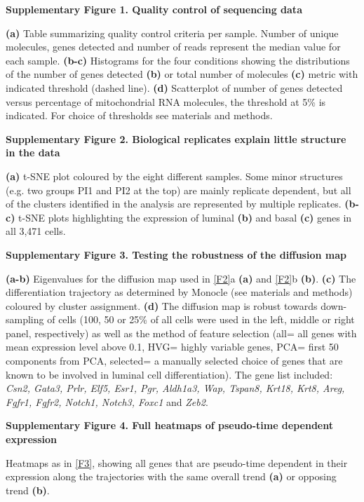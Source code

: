 \documentclass[titlepage, 12pt, oneside]{amsart}
\begin{document}
\textbf{Supplementary Figure 1. Quality control of sequencing data}

\textbf{(a)} Table summarizing quality control criteria per sample.
Number of unique molecules, genes detected and number of reads represent the median value for each sample.
\textbf{(b-c)} Histograms for the four conditions showing the distributions of the number of genes detected \textbf{(b)} or total number of molecules \textbf{(c)} metric with indicated threshold (dashed line).
\textbf{(d)} Scatterplot of number of genes detected versus percentage of mitochondrial RNA molecules, the threshold at 5\% is indicated.
For choice of thresholds see materials and methods.

\textbf{Supplementary Figure 2. Biological replicates explain little
structure in the data }

\textbf{(a)} t-SNE plot coloured by the eight different samples. Some minor structures (e.g. two groups PI1 and PI2 at the top) are mainly replicate dependent, but all of the clusters identified in the analysis are represented by multiple replicates.
\textbf{(b-c)} t-SNE plots highlighting the expression of luminal \textbf{(b)} and basal \textbf{(c)} genes in all 3,471 cells.

\textbf{Supplementary Figure 3. Testing the robustness of the diffusion
map}

\textbf{(a-b)} Eigenvalues for the diffusion map used in \autoref{F2}a
\textbf{(a)} and \autoref{F2}b \textbf{(b)}. 
\textbf{(c)} The differentiation trajectory as determined by Monocle (see materials and methods) coloured by cluster assignment.
\textbf{(d)} The diffusion map is robust towards down-sampling of cells (100, 50 or 25\% of all cells were used in the left, middle or right panel, respectively) as well as the method of feature selection (all= all genes with mean expression level above 0.1, HVG= highly variable genes, PCA= first 50 components from PCA, selected= a manually selected choice of genes that are known to be involved in luminal cell differentiation).
The gene list included: \textit{Csn2, Gata3, Prlr, Elf5, Esr1, Pgr, Aldh1a3, Wap, Tspan8, Krt18, Krt8, Areg, Fgfr1, Fgfr2, Notch1, Notch3, Foxc1} and \textit{Zeb2}.

\textbf{Supplementary Figure 4. Full heatmaps of pseudo-time dependent
expression}

Heatmaps as in \autoref{F3}, showing all genes that are pseudo-time dependent in their expression along the trajectories with the same overall trend \textbf{(a)} or opposing trend \textbf{(b)}.
\end{document}
